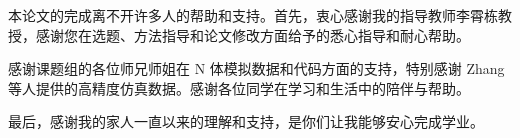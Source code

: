 
\begin{acknowledgements}

本论文的完成离不开许多人的帮助和支持。首先，衷心感谢我的指导教师李霄栋教授，感谢您在选题、方法指导和论文修改方面给予的悉心指导和耐心帮助。

感谢课题组的各位师兄师姐在 N 体模拟数据和代码方面的支持，特别感谢 Zhang 等人提供的高精度仿真数据。感谢各位同学在学习和生活中的陪伴与帮助。

最后，感谢我的家人一直以来的理解和支持，是你们让我能够安心完成学业。

\end{acknowledgements}
